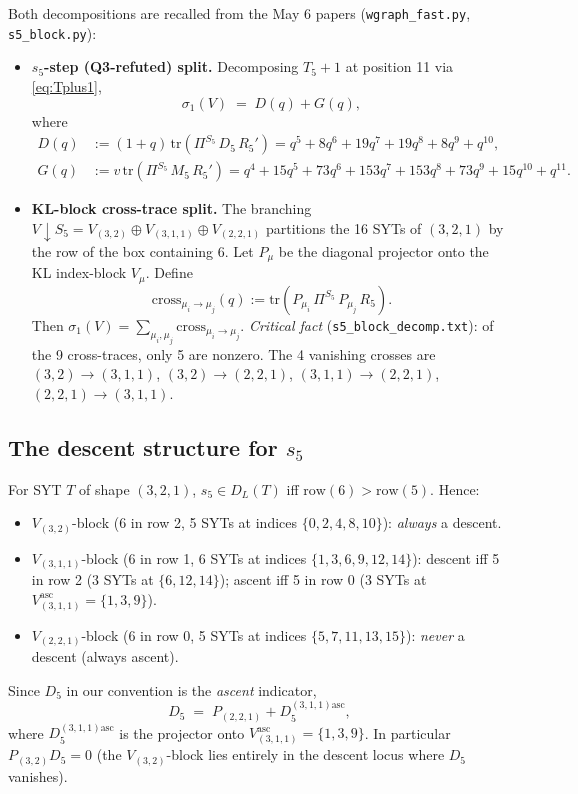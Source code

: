 \documentclass[11pt]{article}
\theoremstyle{definition}
\begin{document}
Both decompositions are recalled from the May 6 papers (\texttt{wgraph\_fast.py}, \texttt{s5\_block.py}):

\begin{itemize}[leftmargin=2em,topsep=0.3em,itemsep=0.2em]
\item \textbf{$s_5$-step (Q3-refuted) split.} Decomposing $T_5+1$ at position 11 via \eqref{eq:Tplus1},
\[
\sigma_1(V) \;=\; D(q) + G(q),
\]
where
\begin{align*}
D(q) &:= (1+q)\, \mathrm{tr}(\Pi^{S_5}\, D_5\, R_5') = q^5 + 8q^6 + 19q^7 + 19q^8 + 8q^9 + q^{10},\\
G(q) &:= v\, \mathrm{tr}(\Pi^{S_5}\, M_5\, R_5') = q^4 + 15q^5 + 73q^6 + 153q^7 + 153q^8 + 73q^9 + 15q^{10} + q^{11}.
\end{align*}

\item \textbf{KL-block cross-trace split.} The branching $V \downarrow S_5 = V_{(3,2)} \oplus V_{(3,1,1)} \oplus V_{(2,2,1)}$ partitions the 16 SYTs of $(3,2,1)$ by the row of the box containing $6$. Let $P_\mu$ be the diagonal projector onto the KL index-block $V_\mu$. Define
\[
\mathrm{cross}_{\mu_i \to \mu_j}(q) := \mathrm{tr}(P_{\mu_i}\, \Pi^{S_5}\, P_{\mu_j}\, R_5).
\]
Then $\sigma_1(V) = \sum_{\mu_i, \mu_j} \mathrm{cross}_{\mu_i \to \mu_j}$. \emph{Critical fact} (\texttt{s5\_block\_decomp.txt}): of the 9 cross-traces, only 5 are nonzero. The 4 vanishing crosses are $(3,2)\!\to\!(3,1,1)$, $(3,2)\!\to\!(2,2,1)$, $(3,1,1)\!\to\!(2,2,1)$, $(2,2,1)\!\to\!(3,1,1)$.
\end{itemize}

\subsection*{The descent structure for $s_5$}

For SYT $T$ of shape $(3,2,1)$, $s_5 \in D_L(T)$ iff $\mathrm{row}(6) > \mathrm{row}(5)$. Hence:
\begin{itemize}[leftmargin=2em,topsep=0.3em,itemsep=0.2em]
\item $V_{(3,2)}$-block (6 in row 2, 5 SYTs at indices $\{0,2,4,8,10\}$): \emph{always} a descent.
\item $V_{(3,1,1)}$-block (6 in row 1, 6 SYTs at indices $\{1,3,6,9,12,14\}$): descent iff 5 in row 2 (3 SYTs at $\{6, 12, 14\}$); ascent iff 5 in row 0 (3 SYTs at $V_{(3,1,1)}^{\mathrm{asc}} = \{1, 3, 9\}$).
\item $V_{(2,2,1)}$-block (6 in row 0, 5 SYTs at indices $\{5,7,11,13,15\}$): \emph{never} a descent (always ascent).
\end{itemize}
Since $D_5$ in our convention is the \emph{ascent} indicator,
\begin{equation}\label{eq:D5-decomp}
D_5 \;=\; P_{(2,2,1)} + D_5^{(3,1,1)\mathrm{asc}},
\end{equation}
where $D_5^{(3,1,1)\mathrm{asc}}$ is the projector onto $V_{(3,1,1)}^{\mathrm{asc}} = \{1, 3, 9\}$. In particular $P_{(3,2)} D_5 = 0$ (the $V_{(3,2)}$-block lies entirely in the descent locus where $D_5$ vanishes).
\end{document}
